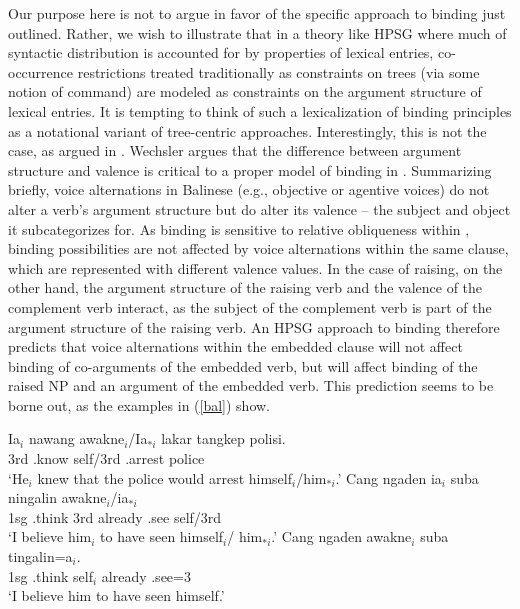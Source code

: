 \documentclass[output=paper
                ,modfonts
                ,nonflat
	        ,collection
	        ,collectionchapter
	        ,collectiontoclongg
 	        ,biblatex
                ,babelshorthands
                ,newtxmath
                ,draftmode
                ,colorlinks, citecolor=brown
]{./langsci/langscibook}
\begin{document}
{Our purpose here is not to argue in favor of the specific approach to binding just outlined. Rather, we wish to illustrate that in a theory like HPSG where much of syntactic distribution is accounted for by properties of lexical entries, co-occurrence restrictions treated traditionally as constraints on trees (via some notion of command) are modeled as constraints on the argument structure of lexical entries. It is tempting to think of such a lexicalization of binding principles as a notational variant of tree-centric approaches. Interestingly, this is not the case, as argued in . Wechsler argues that the difference between argument structure and valence is critical to a proper model of binding in . Summarizing briefly, voice alternations in Balinese  (e.g., objective or agentive voices) do not alter a verb's argument structure but do alter its valence -- the subject and object it subcategorizes for. As binding is sensitive to relative obliqueness within , binding possibilities are not affected by voice alternations within the same clause, which are represented with different valence values. In the case of raising, on the other hand, the argument structure of the raising verb and the valence of the complement verb interact, as the subject of the complement verb is part of the argument structure of the raising verb. An HPSG approach to binding therefore predicts that voice alternations within the embedded clause will not affect binding of co-arguments of the embedded verb, but will affect binding of the raised NP and an argument of the embedded verb. This prediction seems to be borne out, as the  examples in (\ref{bal}) show. 

\begin{exe}
	\ex\label{bal}
	\begin{xlist} 
		\ex\label{bal-a}
		\gll Ia$_{i}$ nawang {awakne$_{i}$/Ia$_{*i}$ } lakar tangkep polisi. \\
		3rd .know self/3rd  .arrest police  \\
		\glt `He$_{i}$ knew that the police would arrest himself$_{i}$/him$_{*i}$.'
		\ex\label{bal-b}
		\gll Cang ngaden ia$_{i}$ suba ningalin awakne$_{i}$/ia$_{*i}$ \\
		1sg .think 3rd already .see self/3rd \\
		\glt `I believe him$_{i}$ to have seen himself$_{i}$/ him$_{*i}$.'
		\ex\label{bal-c}
		\gll Cang ngaden awakne$_{i}$ suba tingalin=a$_{i}$.\\
		1sg .think self$_{i}$ already .see=3 \\
		\glt `I believe him to have seen himself.'
	\end{xlist}
\end{exe} 

}
\end{document}
